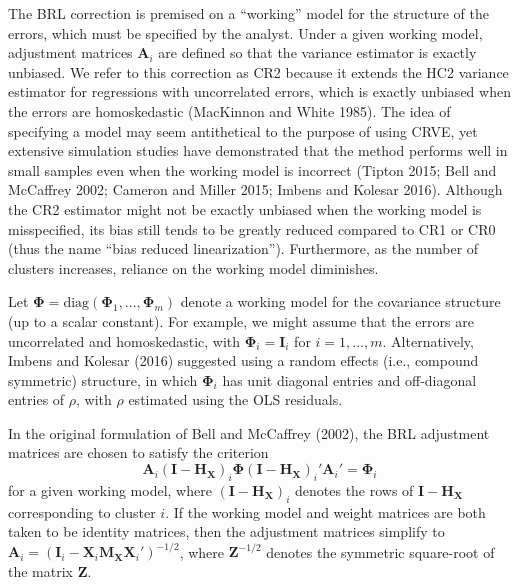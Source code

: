 \documentclass[12pt]{article}
\begin{document}
The BRL correction is premised on a ``working'' model for the structure
of the errors, which must be specified by the analyst. Under a given
working model, adjustment matrices \(\mathbf{A}_i\) are defined so that
the variance estimator is exactly unbiased. We refer to this correction
as CR2 because it extends the HC2 variance estimator for regressions
with uncorrelated errors, which is exactly unbiased when the errors are
homoskedastic (MacKinnon and White 1985). The idea of specifying a model
may seem antithetical to the purpose of using CRVE, yet extensive
simulation studies have demonstrated that the method performs well in
small samples even when the working model is incorrect (Tipton 2015;
Bell and McCaffrey 2002; Cameron and Miller 2015; Imbens and Kolesar
2016). Although the CR2 estimator might not be exactly unbiased when the
working model is misspecified, its bias still tends to be greatly
reduced compared to CR1 or CR0 (thus the name ``bias reduced
linearization''). Furthermore, as the number of clusters increases,
reliance on the working model diminishes.

Let
\(\boldsymbol\Phi = \text{diag}\left(\boldsymbol\Phi_1,...,\boldsymbol\Phi_m\right)\)
denote a working model for the covariance structure (up to a scalar
constant). For example, we might assume that the errors are uncorrelated
and homoskedastic, with \(\boldsymbol\Phi_i = \mathbf{I}_i\) for
\(i = 1,...,m\). Alternatively, Imbens and Kolesar (2016) suggested
using a random effects (i.e., compound symmetric) structure, in which
\(\boldsymbol\Phi_i\) has unit diagonal entries and off-diagonal entries
of \(\rho\), with \(\rho\) estimated using the OLS residuals.

In the original formulation of Bell and McCaffrey (2002), the BRL
adjustment matrices are chosen to satisfy the criterion \begin{equation}
\label{eq:CR2_criterion_BM}
\mathbf{A}_i \left(\mathbf{I} - \mathbf{H_X}\right)_i \boldsymbol\Phi \left(\mathbf{I} - \mathbf{H_X}\right)_i' \mathbf{A}_i'  =  \boldsymbol\Phi_i 
\end{equation} for a given working model, where
\(\left(\mathbf{I} - \mathbf{H_X}\right)_i\) denotes the rows of
\(\mathbf{I} - \mathbf{H_X}\) corresponding to cluster \(i\). If the
working model and weight matrices are both taken to be identity
matrices, then the adjustment matrices simplify to
\(\mathbf{A}_i = \left(\mathbf{I}_i - \mathbf{X}_i \mathbf{M_{X}} \mathbf{X}_i'\right)^{-1/2}\),
where \(\mathbf{Z}^{-1/2}\) denotes the symmetric square-root of the
matrix \(\mathbf{Z}\).
\end{document}
